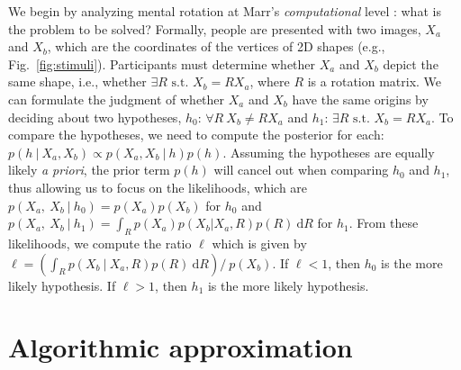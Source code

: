 \documentclass{article} %
\begin{document}
We begin by analyzing mental rotation at Marr's \textit{computational}
level \cite{Marr:1983to}: what is the problem to be solved?  Formally,
people are presented with two images, $X_a$ and $X_b$, which are the
coordinates of the vertices of 2D shapes (e.g.,
Fig.~\ref{fig:stimuli}). Participants must determine whether $X_a$ and
$X_b$ depict the same shape, i.e., whether $\exists R\textrm{ s.t. }
X_b=RX_a$, where $R$ is a rotation matrix. We can formulate the
judgment of whether $X_a$ and $X_b$ have the same origins by deciding
about two hypotheses, $h_0$: $\forall R\ X_b\neq RX_a$ and $h_1$:
$\exists R\textrm{ s.t. } X_b=RX_a$.  To compare the hypotheses, we
need to compute the posterior for each: $p(h\ \vert\ X_a, X_b)\propto
p(X_a, X_b\ \vert\ h)p(h)$. Assuming the hypotheses are equally likely
\textit{a priori}, the prior term $p(h)$ will cancel out when
comparing $h_0$ and $h_1$, thus allowing us to focus on the
likelihoods, which are $p(X_a,\ X_b\ \vert \ h_0)=p(X_a)p(X_b)$ for
$h_0$ and $p(X_a,\ X_b\ \vert \ h_1)=\int_R p(X_a) p(X_b\vert X_a,R)
p(R)\ \mathrm{d}R$ for $h_1$. From these likelihoods, we compute the
ratio $\ell$ which is given by $\ell=\left(\int_R p(X_b\ \vert\ X_a,
  R)p(R)\ \mathrm{d}R\right) /\ p(X_b)$. If $\ell<1$, then $h_0$ is
the more likely hypothesis. If $\ell>1$, then $h_1$ is the more likely
hypothesis.

\section{Algorithmic approximation}
\end{document}
